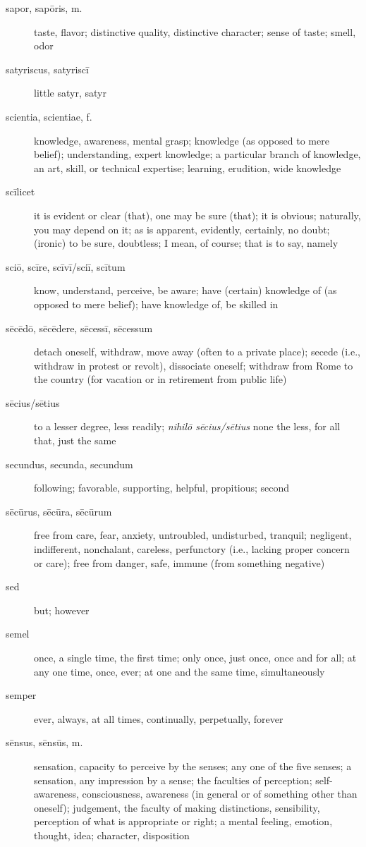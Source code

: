 \begin{description}
    \item[sapor, sapōris, m.] taste, flavor; distinctive quality, distinctive character; sense of taste; smell, odor
    \item[satyriscus, satyriscī] little satyr, satyr
    \item[scientia, scientiae, f.] \marginnote{*}knowledge, awareness, mental grasp; knowledge (as opposed to mere belief); understanding, expert knowledge; a particular branch of knowledge, an art, skill, or technical expertise; learning, erudition, wide knowledge
    \item[scīlicet] it is evident or clear (that), one may be sure (that); it is obvious; naturally, you may depend on it; as is apparent, evidently, certainly, no doubt; (ironic) to be sure, doubtless; I mean, of course; that is to say, namely
    \item[sciō, scīre, scīvī/sciī, scītum] \marginnote{*}know, understand, perceive, be aware; have (certain) knowledge of (as opposed to mere belief);  have knowledge of, be skilled in
    \item[sēcēdō, sēcēdere, sēcessī, sēcessum] detach oneself, withdraw, move away (often to a private place); secede (i.e., withdraw in protest or revolt), dissociate oneself; withdraw from Rome to the country (for vacation or in retirement from public life)
    \item[sēcius/sētius] to a lesser degree, less readily; \textit{nihilō sēcius/sētius} none the less, for all that, just the same
    \item[secundus, secunda, secundum] \marginnote{*}following; favorable, supporting, helpful, propitious; second
    \item[sēcūrus, sēcūra, sēcūrum] \marginnote{*}free from care, fear, anxiety, untroubled, undisturbed, tranquil; negligent, indifferent, nonchalant, careless, perfunctory (i.e., lacking proper concern or care); free from danger, safe, immune (from something negative)
    \item[sed] \marginnote{*}but; however
    \item[semel] \marginnote{*}once, a single time, the first time; only once, just once, once and for all; at any one time, once, ever; at one and the same time, simultaneously
    \item[semper] \marginnote{*}ever, always, at all times, continually, perpetually, forever
    \item[sēnsus, sēnsūs, m.] sensation, capacity to perceive by the senses; any one of the five senses; a sensation, any impression by a sense; the faculties of perception; self-awareness, consciousness, awareness (in general or of something other than oneself); judgement, the faculty of making distinctions, sensibility, perception of what is appropriate or right; a mental feeling, emotion, thought, idea; character, disposition

\end{description}
